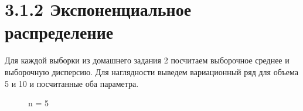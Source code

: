 \documentclass[a4paper,12pt, oneside]{book}
\begin{document}
\section{3.1.2 Экспоненциальное распределение}
\vspace{5mm}


Для каждой выборки из домашнего задания 2 посчитаем выборочное среднее и выборочную дисперсию. Для наглядности выведем вариационный ряд  для объема 5 и 10 и посчитанные оба параметра.

\begin{figure}[h!]
	\begin{center}
		\begin{minipage}[h]{0.47\linewidth}
			 n = 5 \\

\end{minipage}
\end{center}
\end{figure}
\end{document}
